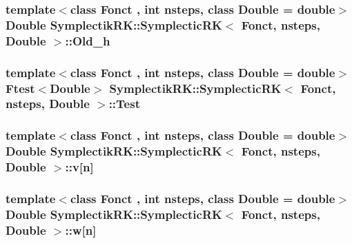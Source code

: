 \hypertarget{classSymplectikRK_1_1SymplecticRK_aa055c87e770cc1b0244cd4d0914186f4}{
\subsubsection[{Old\-\_\-h}]{\setlength{\rightskip}{0pt plus 5cm}template$<$class Fonct , int nsteps, class Double  = double$>$ Double {\bf Symplectik\-R\-K\-::\-Symplectic\-R\-K}$<$ Fonct, nsteps, Double $>$\-::Old\-\_\-h\hspace{0.3cm}{\ttfamily [private]}}}\label{classSymplectikRK_1_1SymplecticRK_aa055c87e770cc1b0244cd4d0914186f4}
\hypertarget{classSymplectikRK_1_1SymplecticRK_a4b2bcb9acb9508391486e297d8b45427}{
\subsubsection[{Test}]{\setlength{\rightskip}{0pt plus 5cm}template$<$class Fonct , int nsteps, class Double  = double$>$ {\bf Ftest}$<$Double$>$ {\bf Symplectik\-R\-K\-::\-Symplectic\-R\-K}$<$ Fonct, nsteps, Double $>$\-::Test\hspace{0.3cm}{\ttfamily [private]}}}\label{classSymplectikRK_1_1SymplecticRK_a4b2bcb9acb9508391486e297d8b45427}
\hypertarget{classSymplectikRK_1_1SymplecticRK_ae7c1e0d9a356b97be10e72dd326643dc}{
\subsubsection[{v}]{\setlength{\rightskip}{0pt plus 5cm}template$<$class Fonct , int nsteps, class Double  = double$>$ Double {\bf Symplectik\-R\-K\-::\-Symplectic\-R\-K}$<$ Fonct, nsteps, Double $>$\-::v\mbox{[}{\bf n}\mbox{]}\hspace{0.3cm}{\ttfamily [private]}}}\label{classSymplectikRK_1_1SymplecticRK_ae7c1e0d9a356b97be10e72dd326643dc}
\hypertarget{classSymplectikRK_1_1SymplecticRK_adcef85c0474b916244a8b1b9f7f2a236}{
\subsubsection[{w}]{\setlength{\rightskip}{0pt plus 5cm}template$<$class Fonct , int nsteps, class Double  = double$>$ Double {\bf Symplectik\-R\-K\-::\-Symplectic\-R\-K}$<$ Fonct, nsteps, Double $>$\-::w\mbox{[}{\bf n}\mbox{]}\hspace{0.3cm}{\ttfamily [private]}}}\label{classSymplectikRK_1_1SymplecticRK_adcef85c0474b916244a8b1b9f7f2a236}
